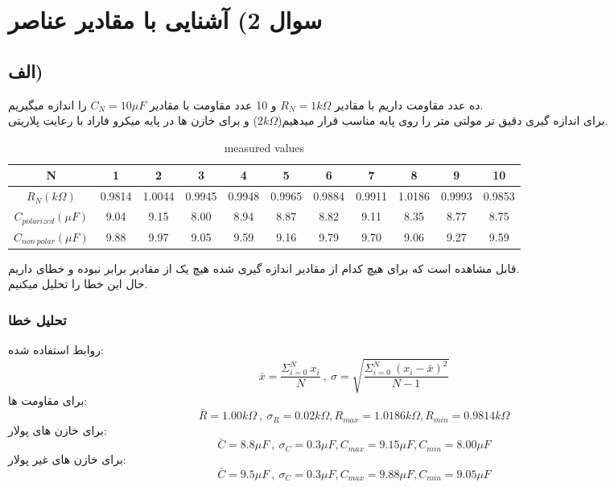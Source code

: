\section{سوال 2) آشنایی با مقادیر عناصر}
\subsection*{\textbf{الف)}}
ده عدد مقاومت داریم با مقادیر $R_N = 1k\Omega$ و
10 عدد مقاومت با مقادیر $C_N = 10\mu F$ را اندازه
میگیریم.\\
برای اندازه گیری دقیق تر مولتی متر را روی پایه مناسب قرار میدهیم($2k\Omega$)
و برای خازن ها در پایه میکرو فاراد با رعایت پلاریتی.
\begin{latin}
    \begin{table}[h]
        \centering
        \begin{tabular}{|c|c|c|c|c|c|c|c|c|c|c|}
            \hline
            N                       & 1      & 2      & 3      & 4      & 5      & 6      & 7      & 8      & 9      & 10     \\
            \hline
            $R_N(k\Omega)$          & 0.9814 & 1.0044 & 0.9945 & 0.9948 & 0.9965 & 0.9884 & 0.9911 & 1.0186 & 0.9993 & 0.9853 \\
            \hline
            $C_{polarized}(\mu F)$  & 9.04   & 9.15   & 8.00   & 8.94   & 8.87   & 8.82   & 9.11   & 8.35   & 8.77   & 8.75   \\
            \hline
            $C_{non\ polar}(\mu F)$ & 9.88   & 9.97   & 9.05   & 9.59   & 9.16   & 9.79   & 9.70   & 9.06   & 9.27   & 9.59   \\
            \hline
        \end{tabular}
        \caption{measured values}
    \end{table}
\end{latin}
قابل مشاهده است که برای هیچ کدام از مقادیر اندازه گیری شده
هیچ یک از مقادیر برابر نبوده و خطای داریم.\\
حال این خطا را تحلیل میکنیم.
\subsubsection{تحلیل خطا}
روابط استفاده شده:$$\bar{x}=\frac{\Sigma_{i=0}^N\ x_i}{N}\ ,
    \ \sigma = \sqrt{\frac{\Sigma_{i=0}^N\ (x_i - \bar{x})^2}{N-1}}$$
برای مقاومت ها:\\
$$\bar{R} = 1.00k\Omega\ , \ \sigma_R = 0.02k\Omega,R_{max}=1.0186k\Omega,R_{min}=0.9814k\Omega$$
برای خازن های پولار:\\
$$\bar{C} = 8.8\mu F\ , \ \sigma_C = 0.3\mu F,C_{max}=9.15\mu F,C_{min}=8.00\mu F$$
برای خازن های غیر پولار:\\
$$\bar{C} = 9.5\mu F\ , \ \sigma_C = 0.3\mu F,C_{max}=9.88\mu F,C_{min}=9.05\mu F$$
\pagebreak